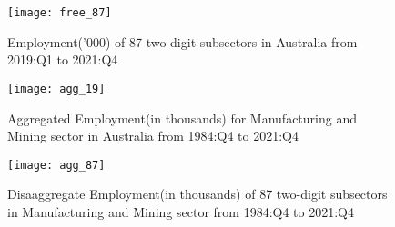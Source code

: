 \documentclass{monashthesis}
\begin{document}
\begin{figure}[t]
\texttt{[image: free\_87]}
\centering
\caption{Employment('000) of 87 two-digit subsectors in Australia from 2019:Q1 to 2021:Q4}
\label{fig:87}
\end{figure}

\begin{figure}[t]
\texttt{[image: agg\_19]}
\centering
\caption{Aggregated Employment(in thousands) for Manufacturing and Mining sector in Australia from 1984:Q4 to 2021:Q4}
\label{fig:a19}
\end{figure}

\begin{figure}[t]
\texttt{[image: agg\_87]}
\centering
\caption{Disaaggregate Employment(in thousands) of 87 two-digit subsectors in Manufacturing and Mining sector from 1984:Q4 to 2021:Q4}
\label{fig:a87}
\end{figure}
\end{document}
